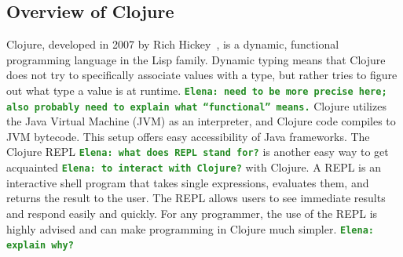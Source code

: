 \documentclass[12pt]{article}
\newcommand{\comment}[1]{{\bf \tt  {#1}}}
\newcommand{\emcomment}[1]{\textcolor{ForestGreen}{\comment{Elena: {#1}}}}
\begin{document}
\subsection{Overview of Clojure}\label{sec:clojure}
  
  
Clojure, developed in 2007 by Rich Hickey~\cite{Hickey:2008}, is a dynamic, functional
programming language in the Lisp family. Dynamic typing means that Clojure does not try to specifically associate
values with a type, but rather tries to figure out what type a value is at runtime.
\emcomment{need to be more precise here; also probably need to explain what ``functional'' means.}
Clojure utilizes the Java Virtual Machine (JVM) as an interpreter, and Clojure code compiles to JVM bytecode.
This setup offers easy 
accessibility of Java frameworks. The Clojure REPL
\emcomment{what does REPL stand for?} 
is another easy way to get acquainted \emcomment{to interact with Clojure?} with Clojure. A REPL is an interactive shell program that takes single 
expressions, evaluates them, and returns the result to the user. The REPL allows users to see immediate results
 and respond easily and quickly. For any programmer, the use of the REPL 
is highly advised and can make programming in Clojure much simpler. 
\emcomment{explain why?}
\end{document}
